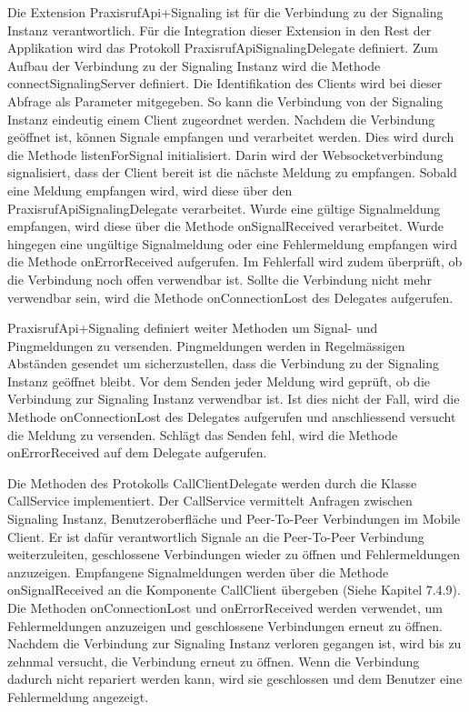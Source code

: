 Die Extension PraxisrufApi+Signaling ist für die Verbindung zu der Signaling Instanz verantwortlich.
Für die Integration dieser Extension in den Rest der Applikation wird das Protokoll PraxisrufApiSignalingDelegate definiert.
Zum Aufbau der Verbindung zu der Signaling Instanz wird die Methode connectSignalingServer definiert.
Die Identifikation des Clients wird bei dieser Abfrage als Parameter mitgegeben.
So kann die Verbindung von der Signaling Instanz eindeutig einem Client zugeordnet werden.
Nachdem die Verbindung geöffnet ist, können Signale empfangen und verarbeitet werden.
Dies wird durch die Methode listenForSignal initialisiert.
Darin wird der Websocketverbindung signalisiert, dass der Client bereit ist die nächste Meldung zu empfangen.
Sobald eine Meldung empfangen wird, wird diese über den PraxisrufApiSignalingDelegate verarbeitet.
Wurde eine gültige Signalmeldung empfangen, wird diese über die Methode onSignalReceived verarbeitet.
Wurde hingegen eine ungültige Signalmeldung oder eine Fehlermeldung empfangen wird die Methode onErrorReceived aufgerufen.
Im Fehlerfall wird zudem überprüft, ob die Verbindung noch offen verwendbar ist.
Sollte die Verbindung nicht mehr verwendbar sein, wird die Methode onConnectionLost des Delegates aufgerufen.

PraxisrufApi+Signaling definiert weiter Methoden um Signal- und Pingmeldungen zu versenden.
Pingmeldungen werden in Regelmässigen Abständen gesendet um sicherzustellen, dass die Verbindung zu der Signaling Instanz geöffnet bleibt.
Vor dem Senden jeder Meldung wird geprüft, ob die Verbindung zur Signaling Instanz verwendbar ist.
Ist dies nicht der Fall, wird die Methode onConnectionLost des Delegates aufgerufen und anschliessend versucht die Meldung zu versenden.
Schlägt das Senden fehl, wird die Methode onErrorReceived auf dem Delegate aufgerufen.

Die Methoden des Protokolls CallClientDelegate werden durch die Klasse CallService implementiert.
Der CallService vermittelt Anfragen zwischen Signaling Instanz, Benutzeroberfläche und Peer-To-Peer Verbindungen im Mobile Client.
Er ist dafür verantwortlich Signale an die Peer-To-Peer Verbindung weiterzuleiten, geschlossene Verbindungen wieder zu öffnen und Fehlermeldungen anzuzeigen.
Empfangene Signalmeldungen werden über die Methode onSignalReceived an die Komponente CallClient übergeben (Siehe Kapitel 7.4.9).
Die Methoden onConnectionLost und onErrorReceived werden verwendet, um Fehlermeldungen anzuzeigen und geschlossene Verbindungen erneut zu öffnen.
Nachdem die Verbindung zur Signaling Instanz verloren gegangen ist, wird bis zu zehnmal versucht, die Verbindung erneut zu öffnen.
Wenn die Verbindung dadurch nicht repariert werden kann, wird sie geschlossen und dem Benutzer eine Fehlermeldung angezeigt.

